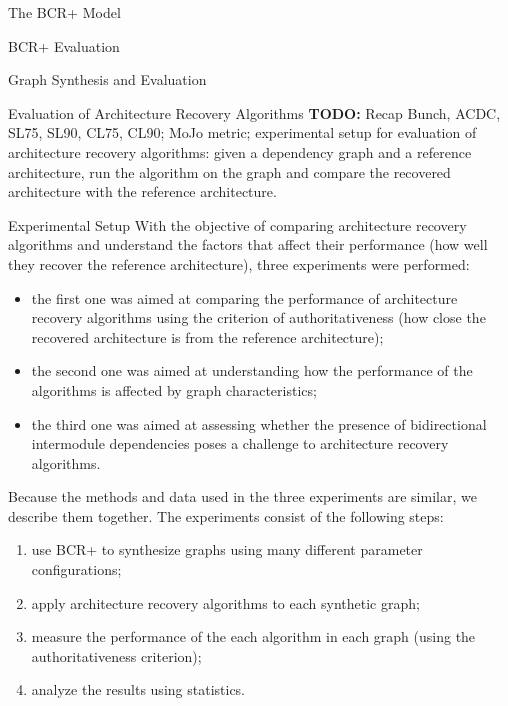 \documentclass[11pt,twocolumn,a4paper,english]{article}
\newcommand{\TODO}{\textbf{TODO:} }
\begin{document}
\begin{section}{The BCR+ Model}
\begin{subsection}{BCR+ Evaluation}
\begin{subsubsection}{Graph Synthesis and Evaluation}
	
	
\end{subsubsection}

\end{subsection}	
\end{section}


\begin{section}{Evaluation of Architecture Recovery Algorithms}
	\TODO Recap Bunch, ACDC, SL75, SL90, CL75, CL90; MoJo metric; experimental setup for evaluation of architecture recovery algorithms: given a dependency graph and a reference architecture, run the algorithm on the graph and compare the recovered architecture with the reference architecture.

\begin{subsection}{Experimental Setup}
	With the objective of comparing architecture recovery algorithms and understand the factors that affect their performance (how well they recover the reference architecture), three experiments were performed:
	
	\begin{itemize}
		\item the first one was aimed at comparing the performance of architecture recovery algorithms using the criterion of authoritativeness (how close the recovered architecture is from the reference architecture);
		\item the second one was aimed at understanding how the performance of the algorithms is affected by graph characteristics;
		\item the third one was aimed at assessing whether the presence of bidirectional intermodule dependencies poses a challenge to architecture recovery algorithms.
	\end{itemize}
	 
	Because the methods and data used in the three experiments are similar, we describe them together. The experiments consist of the following steps:
	
	\begin{enumerate}
		\item use BCR+ to synthesize graphs using many different parameter configurations;
		\item apply architecture recovery algorithms to each synthetic graph;
		\item measure the performance of the each algorithm in each graph (using the authoritativeness criterion);
		\item analyze the results using statistics.
	\end{enumerate}
	

\end{subsection}
\end{section}
\end{document}

